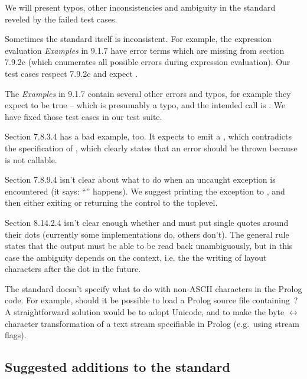 \documentclass[draft]{llncs}%
\begin{document}
We will present typos, other inconsistencies and ambiguity in
the standard reveled by the failed test cases.

Sometimes the standard itself is inconsistent. For example, the expression
evaluation \emph{Examples} in 9.1.7 have error terms which are missing from
section 7.9.2c (which enumerates all possible errors during expression
evaluation). Our test cases respect 7.9.2c and expect
.

The \emph{Examples} in 9.1.7 contain several other errors and typos, for
example they expect  to be true -- which is presumably a
typo, and the intended call is . We have fixed those test
cases in our test suite.

Section 7.8.3.4 has a bad example, too. It expects
 to emit a , which contradicts the
specification of , which clearly states that an error should
be thrown because  is not callable.

Section 7.8.9.4 isn't clear about what to do when an uncaught exception is
encountered (it says: ``'' happens). We suggest
printing the exception to , and then either exiting
or returning the control to the toplevel.

Section 8.14.2.4 isn't clear enough whether
 and
must put single quotes around their dots (currently some implementations do,
others don't). The
general rule states that the output must be able to be read back
unambiguously, but in this case the ambiguity depends on the context, i.e.
the the writing of layout characters after the dot in the future.

The standard doesn't specify what to do
with non-ASCII characters in the Prolog
code. For example, should it be possible to load a Prolog source file
containing \,? A straightforward solution would be to adopt
Unicode, and to make the byte $\leftrightarrow$ character
transformation of a text stream specifiable in Prolog (e.g.\
using stream flags).


\subsection{Suggested additions to the standard}
\end{document}
